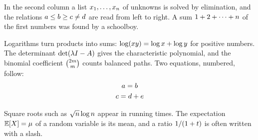 \documentclass{article}
\newcommand*\pdfcraftbegin[1]{\special{pdfcraft:eq:#1:begin}}
\newcommand*\pdfcraftend[1]{\special{pdfcraft:eq:#1:end}}
\begin{document}
In the second column a list $\pdfcraftbegin{ldots_list@twocol_a}
x_1, \ldots, x_n
\pdfcraftend{ldots_list@twocol_a}$ of unknowns is solved by elimination, and the
relations $\pdfcraftbegin{rel_order@twocol_a}
a \le b \ge c \ne d
\pdfcraftend{rel_order@twocol_a}$ are read from left to right. A sum $\pdfcraftbegin{cdots_sum@twocol_a}
1 + 2 + \cdots + n
\pdfcraftend{cdots_sum@twocol_a}$ of the first numbers
was found by a schoolboy.

\clearpage
\twocolumn
Logarithms turn products into sums: $\pdfcraftbegin{log_product@twocol_b}
\log(xy) = \log x + \log y
\pdfcraftend{log_product@twocol_b}$ for positive numbers. The determinant
$\pdfcraftbegin{det_char@twocol_b}
\det(\lambda I - A)
\pdfcraftend{det_char@twocol_b}$ gives the characteristic polynomial, and the binomial coefficient $\pdfcraftbegin{binom_inline@twocol_b}
\binom{2m}{m}
\pdfcraftend{binom_inline@twocol_b}$
counts balanced paths. Two equations, numbered, follow:
\begin{gather}\pdfcraftbegin{gather_rows@twocol_b}
a = b \\ c = d + e
\pdfcraftend{gather_rows@twocol_b}\end{gather}
\newpage

Square roots such as $\pdfcraftbegin{sqrt_inline@twocol_b}
\sqrt{n}\log n
\pdfcraftend{sqrt_inline@twocol_b}$ appear in running times. The expectation $\pdfcraftbegin{expectation@twocol_b}
\mathbb{E}[X] = \mu
\pdfcraftend{expectation@twocol_b}$
of a random variable is its mean, and a ratio $\pdfcraftbegin{slash_fraction@twocol_b}
1/(1+t)
\pdfcraftend{slash_fraction@twocol_b}$ is often written with a slash.

\clearpage
\end{document}
